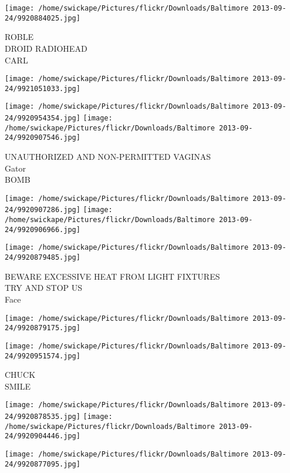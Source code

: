 \documentclass[10pt,letterpaper]{article}
\begin{document}
\vspace{0.25in}
\texttt{[image: /home/swickape/Pictures/flickr/Downloads/Baltimore 2013-09-24/9920884025.jpg]}

ROBLE\\
DROID RADIOHEAD\\
CARL
\pagebreak

\texttt{[image: /home/swickape/Pictures/flickr/Downloads/Baltimore 2013-09-24/9921051033.jpg]}

\vspace{0.25in}
\texttt{[image: /home/swickape/Pictures/flickr/Downloads/Baltimore 2013-09-24/9920954354.jpg]}
\texttt{[image: /home/swickape/Pictures/flickr/Downloads/Baltimore 2013-09-24/9920907546.jpg]}

UNAUTHORIZED AND NON{-}PERMITTED VAGINAS\\
Gator\\
BOMB
\pagebreak

\texttt{[image: /home/swickape/Pictures/flickr/Downloads/Baltimore 2013-09-24/9920907286.jpg]}
\texttt{[image: /home/swickape/Pictures/flickr/Downloads/Baltimore 2013-09-24/9920906966.jpg]}

\vspace{0.25in}
\texttt{[image: /home/swickape/Pictures/flickr/Downloads/Baltimore 2013-09-24/9920879485.jpg]}

BEWARE EXCESSIVE HEAT FROM LIGHT FIXTURES\\
TRY AND STOP US\\
Face
\pagebreak

\texttt{[image: /home/swickape/Pictures/flickr/Downloads/Baltimore 2013-09-24/9920879175.jpg]}

\vspace{0.25in}
\texttt{[image: /home/swickape/Pictures/flickr/Downloads/Baltimore 2013-09-24/9920951574.jpg]}

CHUCK\\
SMILE
\pagebreak

\texttt{[image: /home/swickape/Pictures/flickr/Downloads/Baltimore 2013-09-24/9920878535.jpg]}
\texttt{[image: /home/swickape/Pictures/flickr/Downloads/Baltimore 2013-09-24/9920904446.jpg]}

\vspace{0.25in}
\texttt{[image: /home/swickape/Pictures/flickr/Downloads/Baltimore 2013-09-24/9920877095.jpg]}
\end{document}
